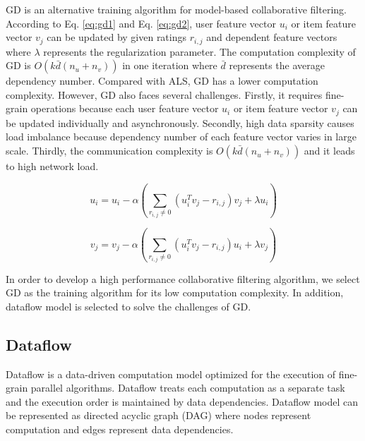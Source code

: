 \documentclass{llncs}
\begin{document}
GD is an alternative training algorithm for model-based collaborative filtering. According to Eq. \ref{eq:gd1} and Eq. \ref{eq:gd2},
user feature vector $u_i$ or item feature vector $v_j$ can be updated by given ratings $r_{i,j}$ and dependent feature vectors where $\lambda$ represents the regularization parameter. The computation complexity of GD is $O(k\bar{d}(n_u + n_v))$ in one iteration where $\bar{d}$ represents the average dependency number. Compared with ALS, GD has a lower computation complexity. However, GD also faces several challenges. Firstly, it requires fine-grain operations because each user feature vector $u_i$ or item feature vector $v_j$ can be updated individually and asynchronously. Secondly, high data sparsity causes load imbalance because dependency number of each feature vector varies in large scale. Thirdly, the communication complexity is $O(k\bar{d}(n_u + n_v))$ and it leads to high network load.
\vspace{-5pt}

\begin{equation}
\label{eq:gd1}
  u_i = u_i - \alpha (\sum_{r_{i,j} \neq 0}(u_i^Tv_j - r_{i,j})v_j + \lambda u_i)
\end{equation}
\vspace{-15pt}

\begin{equation}
\label{eq:gd2}
v_j = v_j - \alpha (\sum_{r_{i,j} \neq 0}(u^T_iv_j - r_{i,j})u_i + \lambda v_j)
\end{equation}
\vspace{-10pt}

In order to develop a high performance collaborative filtering algorithm, we select GD as the training algorithm for its low computation complexity. In addition, dataflow model is selected to solve the challenges of GD.

\vspace{-15pt}
\subsection{Dataflow}
\vspace{-5pt}

Dataflow \cite{dataflow} is a data-driven computation model optimized for the execution of fine-grain parallel algorithms. Dataflow treats each computation as a separate task and the execution order is maintained by data dependencies.
Dataflow model can be represented as directed acyclic graph (DAG) where nodes
represent computation and edges represent data dependencies.
\end{document}
